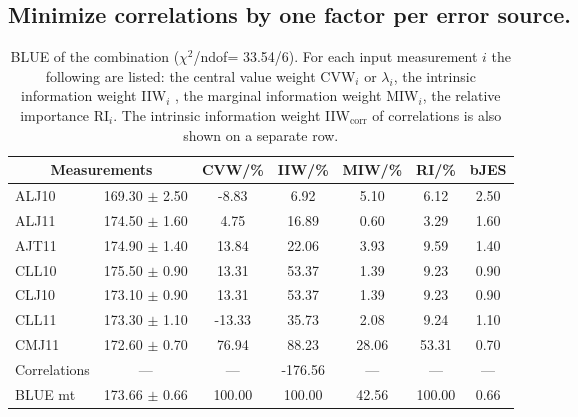 \subsection{Minimize correlations by one factor per error source.}
\begin{table}[H]
\scriptsize
\begin{center}
\renewcommand{\arraystretch}{1.1}
\begin{tabular}{|lc|c|c|c|c|c|}
\hline
\multicolumn{2}{|c|}{Measurements} & CVW/\%  & IIW/\%  & MIW/\%  & RI/\%  & {\tiny bJES}\\
\hline
ALJ10 &     169.30 $\pm$       2.50 &      -8.83 &       6.92 &       5.10 &       6.12 &       2.50\\
ALJ11 &     174.50 $\pm$       1.60 &       4.75 &      16.89 &       0.60 &       3.29 &       1.60\\
AJT11 &     174.90 $\pm$       1.40 &      13.84 &      22.06 &       3.93 &       9.59 &       1.40\\
CLL10 &     175.50 $\pm$       0.90 &      13.31 &      53.37 &       1.39 &       9.23 &       0.90\\
CLJ10 &     173.10 $\pm$       0.90 &      13.31 &      53.37 &       1.39 &       9.23 &       0.90\\
CLL11 &     173.30 $\pm$       1.10 &     -13.33 &      35.73 &       2.08 &       9.24 &       1.10\\
CMJ11 &     172.60 $\pm$       0.70 &      76.94 &      88.23 &      28.06 &      53.31 &       0.70\\
Correlations & --- & --- &    -176.56 & --- & --- & ---\\
\hline
BLUE {\tiny mt} &     173.66 $\pm$       0.66 &     100.00 &     100.00 &      42.56 &     100.00 &       0.66\\
\hline
\end{tabular}
\caption{BLUE of the combination ($\chi^2$/ndof=     33.54/6).
 For each input measurement $i$ the following are listed: the central value weight CVW$_i$ or $\lambda_i$, the intrinsic information weight IIW$_i$ , the marginal information weight MIW$_i$, the relative importance RI$_i$. The intrinsic information weight IIW$_{\mathrm{corr}}$ of correlations is also shown on a separate row.}
\renewcommand{\arraystretch}{1}
\end{center}
\end{table}
